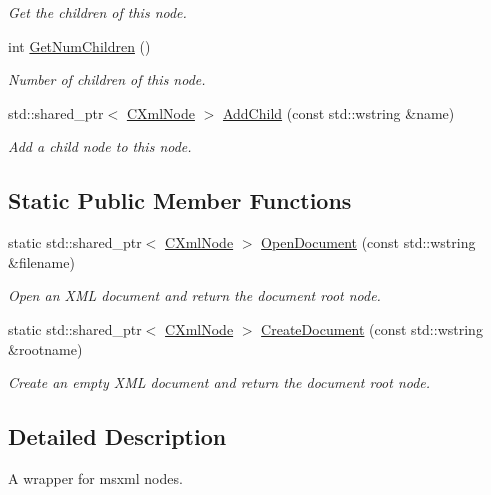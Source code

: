 \begin{DoxyCompactItemize}
\begin{DoxyCompactList}\small\item\em Get the children of this node. \end{DoxyCompactList}\item 
int \mbox{\hyperlink{classxmlnode_1_1_c_xml_node_ab455bd55e7f3dbd550e81d7fe293d146}{Get\+Num\+Children}} ()
\begin{DoxyCompactList}\small\item\em Number of children of this node. \end{DoxyCompactList}\item 
std\+::shared\+\_\+ptr$<$ \mbox{\hyperlink{classxmlnode_1_1_c_xml_node}{C\+Xml\+Node}} $>$ \mbox{\hyperlink{classxmlnode_1_1_c_xml_node_a7227a654358ffb87a2a57c165dee509c}{Add\+Child}} (const std\+::wstring \&name)
\begin{DoxyCompactList}\small\item\em Add a child node to this node. \end{DoxyCompactList}\end{DoxyCompactItemize}
\subsection*{Static Public Member Functions}
\begin{DoxyCompactItemize}
\item 
static std\+::shared\+\_\+ptr$<$ \mbox{\hyperlink{classxmlnode_1_1_c_xml_node}{C\+Xml\+Node}} $>$ \mbox{\hyperlink{classxmlnode_1_1_c_xml_node_ad71ff87937ae943a9c11f5891d53d93b}{Open\+Document}} (const std\+::wstring \&filename)
\begin{DoxyCompactList}\small\item\em Open an X\+ML document and return the document root node. \end{DoxyCompactList}\item 
static std\+::shared\+\_\+ptr$<$ \mbox{\hyperlink{classxmlnode_1_1_c_xml_node}{C\+Xml\+Node}} $>$ \mbox{\hyperlink{classxmlnode_1_1_c_xml_node_ae50a4482c4ea73492001f91788945bb1}{Create\+Document}} (const std\+::wstring \&rootname)
\begin{DoxyCompactList}\small\item\em Create an empty X\+ML document and return the document root node. \end{DoxyCompactList}\end{DoxyCompactItemize}


\subsection{Detailed Description}
A wrapper for msxml nodes. 

